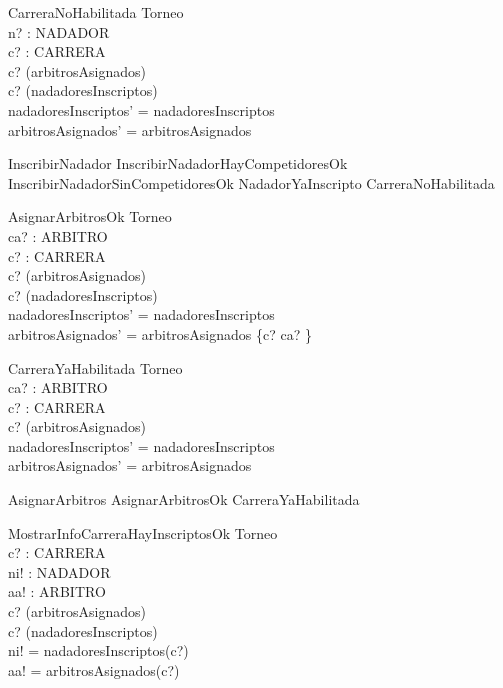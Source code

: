 \begin{schema}{CarreraNoHabilitada}
\Xi Torneo \\
n? : NADADOR \\
c? : CARRERA \\
\where
c? \notin \dom(arbitrosAsignados) \\
c? \notin \dom(nadadoresInscriptos) \\
nadadoresInscriptos' = nadadoresInscriptos \\
arbitrosAsignados' = arbitrosAsignados
\end{schema}

\begin{zed}
InscribirNadador  InscribirNadadorHayCompetidoresOk \lor InscribirNadadorSinCompetidoresOk \lor NadadorYaInscripto \lor CarreraNoHabilitada
\end{zed}

\begin{schema}{AsignarArbitrosOk}
\Delta Torneo \\
ca? : \power ARBITRO \\
c? : CARRERA \\
\where
c? \notin \dom(arbitrosAsignados) \\
c? \notin \dom(nadadoresInscriptos) \\
nadadoresInscriptos' = nadadoresInscriptos \\
arbitrosAsignados' = arbitrosAsignados \cup \{c? \mapsto ca? \}
\end{schema}

\begin{schema}{CarreraYaHabilitada}
\Xi Torneo \\
ca? : \power ARBITRO \\
c? : CARRERA \\
\where
c? \in \dom(arbitrosAsignados) \\
nadadoresInscriptos' = nadadoresInscriptos \\
arbitrosAsignados' = arbitrosAsignados
\end{schema}

\begin{zed}
AsignarArbitros  AsignarArbitrosOk \lor CarreraYaHabilitada
\end{zed}

\begin{schema}{MostrarInfoCarreraHayInscriptosOk}
\Xi Torneo \\
c? : CARRERA \\
ni! : \power NADADOR \\
aa! : \power ARBITRO \\
\where
c? \in \dom(arbitrosAsignados) \\
c? \in \dom(nadadoresInscriptos) \\
ni! = nadadoresInscriptos(c?) \\
aa! = arbitrosAsignados(c?)
\end{schema}

